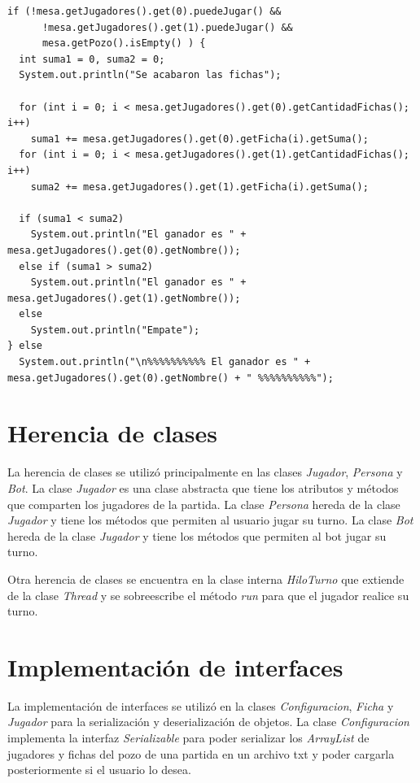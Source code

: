 \documentclass[12pt]{article}
\begin{document}
  \begin{lstlisting}
if (!mesa.getJugadores().get(0).puedeJugar() && 
      !mesa.getJugadores().get(1).puedeJugar() &&
      mesa.getPozo().isEmpty() ) {
  int suma1 = 0, suma2 = 0;
  System.out.println("Se acabaron las fichas");

  for (int i = 0; i < mesa.getJugadores().get(0).getCantidadFichas(); i++)
    suma1 += mesa.getJugadores().get(0).getFicha(i).getSuma();
  for (int i = 0; i < mesa.getJugadores().get(1).getCantidadFichas(); i++)
    suma2 += mesa.getJugadores().get(1).getFicha(i).getSuma();
  
  if (suma1 < suma2)
    System.out.println("El ganador es " + mesa.getJugadores().get(0).getNombre());
  else if (suma1 > suma2)
    System.out.println("El ganador es " + mesa.getJugadores().get(1).getNombre());
  else
    System.out.println("Empate");
} else 
  System.out.println("\n%%%%%%%%%% El ganador es " + mesa.getJugadores().get(0).getNombre() + " %%%%%%%%%%");
  \end{lstlisting}

  \section{Herencia de clases}
  La herencia de clases se utilizó principalmente en las clases \textit{Jugador}, \textit{Persona} y \textit{Bot}. La clase \textit{Jugador} es una clase abstracta que tiene los atributos y métodos que comparten los jugadores de la partida. La clase \textit{Persona} hereda de la clase \textit{Jugador} y tiene los métodos que permiten al usuario jugar su turno. La clase \textit{Bot} hereda de la clase \textit{Jugador} y tiene los métodos que permiten al bot jugar su turno.

  Otra herencia de clases se encuentra en la clase interna \textit{HiloTurno} que extiende de la clase \textit{Thread} y se sobreescribe el método \textit{run} para que el jugador realice su turno.

  \section{Implementación de interfaces}
  La implementación de interfaces se utilizó en la clases \textit{Configuracion}, \textit{Ficha} y \textit{Jugador} para la serialización y deserialización de objetos. La clase \textit{Configuracion} implementa la interfaz \textit{Serializable} para poder serializar los \textit{ArrayList} de jugadores y fichas del pozo de una partida en un archivo txt y poder cargarla posteriormente si el usuario lo desea.
\end{document}
